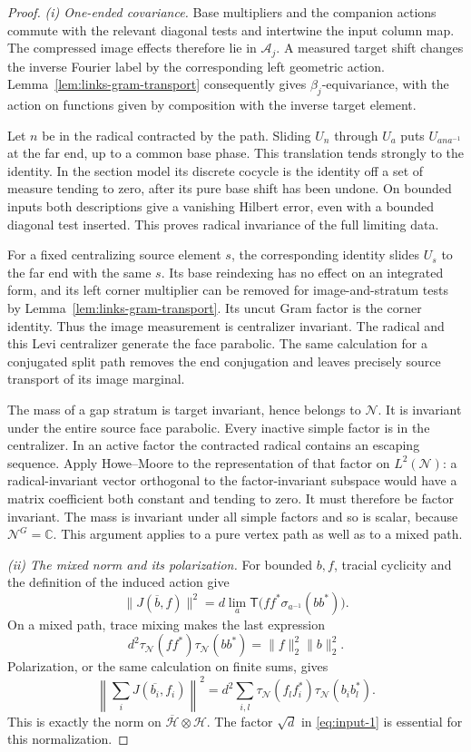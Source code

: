 \begin{proof}
\emph{(i) One-ended covariance.}
Base multipliers and the companion actions commute with the relevant
diagonal tests and intertwine the input column map. The compressed
image effects therefore lie in \(\mathcal A_j\). A measured target
shift changes the inverse Fourier label by the corresponding left
geometric action. Lemma~\ref{lem:links-gram-transport} consequently
gives \(\beta_j\)-equivariance, with the action on functions given
by composition with the inverse target element.

Let \(n\) be in the radical contracted by the path. Sliding
\(U_n\) through \(U_a\) puts \(U_{ana^{-1}}\) at the far end,
up to a common base phase. This translation tends strongly to the
identity. In the section model its discrete cocycle is the identity
off a set of measure tending to zero, after its pure base shift has
been undone. On bounded inputs both descriptions give a vanishing
Hilbert error, even with a bounded diagonal test inserted. This
proves radical invariance of the full limiting data.

For a fixed centralizing source element \(s\), the corresponding
identity slides \(U_s\) to the far end with the same \(s\).
Its base reindexing has no effect on an integrated form, and its
left corner multiplier can be removed for image-and-stratum tests
by Lemma~\ref{lem:links-gram-transport}. Its uncut Gram factor is
the corner identity. Thus the image measurement is centralizer
invariant. The radical and this Levi centralizer generate the face
parabolic. The same calculation for a conjugated split path removes
the end conjugation and leaves precisely source transport of its
image marginal.

The mass of a gap stratum is target invariant, hence belongs to
\(\mathcal N\). It is invariant under the entire source face
parabolic. Every inactive simple factor is in the centralizer. In
an active factor the contracted radical contains an escaping
sequence. Apply Howe--Moore to the representation of that factor
on \(L^2(\mathcal N)\): a radical-invariant vector orthogonal to
the factor-invariant subspace would have a matrix coefficient both
constant and tending to zero. It must therefore be factor invariant.
The mass is invariant under all simple factors and so is scalar,
because \(\mathcal N^G=\mathbb C\). This argument applies to a
pure vertex path as well as to a mixed path.

\emph{(ii) The mixed norm and its polarization.}
For bounded \(b,f\), tracial cyclicity and the definition of the
induced action give
\[
 \|J(\overline b,f)\|^2
  =d\lim_a\mathsf T\bigl(ff^*\sigma_{a^{-1}}(bb^*)\bigr).
\]
On a mixed path, trace mixing makes the last expression
\[
 d^2\tau_{\mathcal N}(ff^*)\tau_{\mathcal N}(bb^*)
       =\|f\|_2^2\|b\|_2^2.
\]
Polarization, or the same calculation on finite sums, gives
\[
 \left\|\sum_iJ(\overline{b_i},f_i)\right\|^2
  =d^2\sum_{i,l}
      \tau_{\mathcal N}(f_lf_i^*)
      \tau_{\mathcal N}(b_ib_l^*).
\]
This is exactly the norm on
\(\overline{\mathcal H}\otimes\mathcal H\). The factor
\(\sqrt d\) in \eqref{eq:input-1} is essential for this
normalization.


\end{proof}
